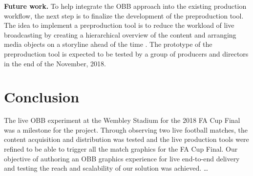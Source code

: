 \documentclass[sigchi-a, authorversion]{acmart}
\begin{document}
\textbf{Future work.} To help integrate the OBB approach into the existing production workflow, the next step is to finalize the development of the preproduction tool. The idea to implement a preproduction tool is to reduce the workload of live broadcasting by creating a hierarchical overview of the content and arranging media objects on a storyline ahead of the time \cite{Li:2018_TVX}. The prototype of the preproduction tool is expected to be tested by a group of producers and directors in the end of the November, 2018.

\section{Conclusion}
The live OBB experiment at the Wembley Stadium for the 2018 FA Cup Final was a milestone for the project. Through observing two live football matches, the content acquisition and distribution was tested and the live production tools were refined to be able to trigger all the match graphics for the FA Cup Final. Our objective of authoring an OBB graphics experience for live end-to-end delivery and testing the reach and scalability of our solution was achieved. 
\ldots



\end{document}
